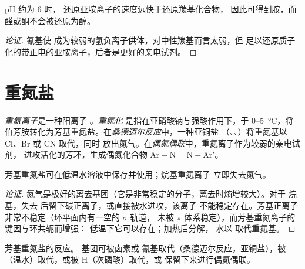 \begin{proposition}[还原胺化的选择性]\label{prop:b2:amines:reductive-amination}
pH 约为 6 时， 还原亚胺离子的速度远快于还原羰基化合物，
因此可得到胺，而醛或酮不会被还原为醇。
\end{proposition}

\begin{proof}[论证]
氰基使  成为较弱的氢负离子供体，对中性羰基而言太弱，但
足以还原质子化的带正电的亚胺离子，后者是更好的亲电试剂。
\end{proof}

\section{重氮盐}

\begin{definition}[重氮化学]\label{def:b2:amines:diazonium}
\emph{重氮离子}是一种阳离子 。\emph{重氮化}
是指在亚硝酸钠与强酸作用下，于
0--\qty{5}{\degreeCelsius}，将伯芳胺转化为芳基重氮盐。在\emph{桑德迈尔反应}中，一种亚铜盐
（、、）将重氮基以 Cl、Br 或 CN 取代，同时
放出氮气。在\emph{偶氮偶联}中，重氮离子作为较弱的亲电试剂，
进攻活化的芳环，生成偶氮化合物 $\mathrm{Ar{-}N{=}N{-}Ar'}$。
\end{definition}

\begin{proposition}[重氮离子的稳定性]\label{prop:b2:amines:diazonium}
芳基重氮盐可在低温水溶液中保存并使用；烷基重氮离子
立即失去氮气。
\end{proposition}

\begin{proof}[论证]
氮气是极好的离去基团（它是非常稳定的分子，离去时熵增较大）。对于
烷基，失去  后留下碳正离子，或直接被水进攻，该离子
不能稳定存在。芳基正离子非常不稳定（环平面内有一空的 $\sigma$ 轨道，
未被 $\pi$ 体系稳定），而芳基重氮离子的  键因与环共轭而增强：
低温下它可以存在；加热后分解，
水以  取代重氮基。
\end{proof}

\begin{omfigure}

{\small 芳基重氮盐的反应。 基团可被卤素或
氰基取代（桑德迈尔反应，亚铜盐），被 （温水）取代，或被 H（次磷酸）取代，或
保留下来进行偶氮偶联。}
\end{omfigure}

